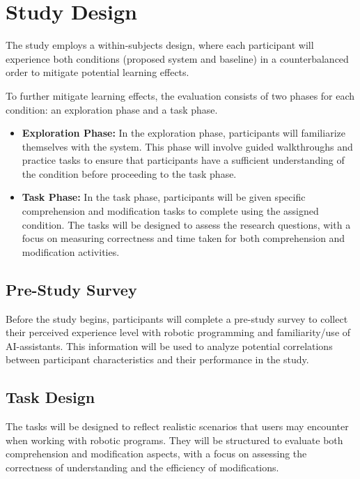 \section{Study Design}
The study employs a within-subjects design, where each participant will experience both conditions (proposed system and baseline) in a counterbalanced order to mitigate potential learning effects.

To further mitigate learning effects, the evaluation consists of two phases for each condition: an exploration phase and a task phase.
\begin{itemize}
    \item \textbf{Exploration Phase:} In the exploration phase, participants will familiarize themselves with the system. This phase will involve guided walkthroughs and practice tasks to ensure that participants have a sufficient understanding of the condition before proceeding to the task phase.
    \item \textbf{Task Phase:} In the task phase, participants will be given specific comprehension and modification tasks to complete using the assigned condition. The tasks will be designed to assess the research questions, with a focus on measuring correctness and time taken for both comprehension and modification activities.
\end{itemize}


\subsection{Pre-Study Survey}
Before the study begins, participants will complete a pre-study survey to collect their perceived experience level with robotic programming and familiarity/use of AI-assistants. This information will be used to analyze potential correlations between participant characteristics and their performance in the study.


\subsection{Task Design}
The tasks will be designed to reflect realistic scenarios that users may encounter when working with robotic programs. They will be structured to evaluate both comprehension and modification aspects, with a focus on assessing the correctness of understanding and the efficiency of modifications.

